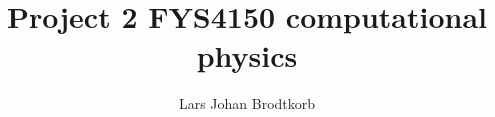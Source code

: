 \documentclass[10pt,a4paper]{article}
\begin{document}
\title{Project 2 FYS4150 computational physics}
\author{Lars Johan Brodtkorb}
\maketitle


\tableofcontents
\newpage






%
%
\end{document}
